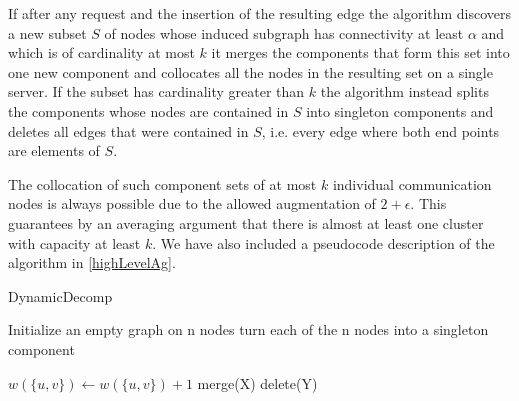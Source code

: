 \documentclass[xcolor=dvipsnames, tikz, 12pt]{article}
\newcommand{\nl}{\newline}
\theoremstyle{definition}
\begin{document}
	If after any request and the insertion of the resulting edge the algorithm discovers a new subset $S$ of nodes whose induced subgraph has connectivity at least $\alpha$ and which is of cardinality at most $k$ it merges the components that form this set into one new component and collocates all the nodes in the resulting set on a single server. If the subset has cardinality greater than $k$ the algorithm instead splits the components whose nodes are contained in $S$ into singleton components and deletes all edges that were contained in $S$, i.e. every edge where both end points are elements of $S$.
	
	The collocation of such component sets of at most $k$ individual communication nodes is always possible due to the allowed augmentation of $2+\epsilon$. This guarantees by an averaging argument that there is almost at least one cluster with capacity at least $k$. We have also included a pseudocode description of the algorithm in \cref{highLevelAg}.\nl\nl
	
	\begin{algorithm}
		\caption{DynamicDecomp}
		\label{highLevelAg}
		\begin{algorithmic}
			\STATE Initialize an empty graph on n nodes
			\STATE turn each of the n nodes into a singleton component
			
			\STATE $w(\{u,v\})\gets w(\{u,v\})+1$
			\ENDIF
			\STATE merge(X)
			\ENDIF
			\STATE delete(Y)
			\ENDIF	
			
			\ENDFOR
					
		\end{algorithmic}
	\end{algorithm}
	
\end{document}
